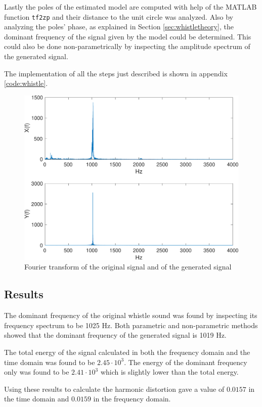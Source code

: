 \documentclass{IEEEtran}
\newcommand{\code}[1]{\texttt{#1}}
\begin{document}
Lastly the poles of the estimated model are computed with help of the
MATLAB function \code{tf2zp} and their distance to the unit circle was
analyzed. Also by analyzing the poles' phase, as explained in Section
\ref{sec:whistletheory}, the dominant frequency of the signal given by
the model could be determined. This could also be done non-parametrically
by inspecting the amplitude spectrum of the generated signal.

The implementation of all the steps just described is shown in appendix
\ref{code:whistle}.

\begin{figure}[h]
  \centering
  \captionsetup{justification=centering}

  \includegraphics[width=0.8\columnwidth]{pictures/whistle_gen_freq.pdf}
  \caption{Fourier transform of the original signal and of the generated signal}
  \label{1:whistle_gen_freq}

\end{figure}

\subsection{Results}
The dominant frequency of the original whistle sound was found by inspecting
its frequency spectrum to be 1025 Hz. Both parametric and non-parametric
methods showed that the dominant frequency of the generated signal is 1019 Hz.

The total energy of the signal calculated in both the frequency domain and
the time domain was found to be $2.45\cdot10^3$. The energy of the dominant
frequency only was found to be $2.41\cdot10^3$ which is slightly lower
than the total energy.

Using these results to calculate the harmonic distortion gave a value
of $0.0157$ in the time domain and $0.0159$ in the frequency domain.
\end{document}
